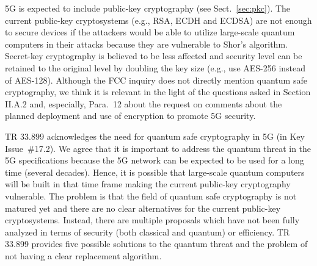 \documentclass[12pt]{llncs}
\begin{document}
5G is expected to include public-key cryptography (see Sect.~\ref{sec:pkc}). The current public-key cryptosystems (e.g., RSA, ECDH and ECDSA) are not enough to secure devices if the attackers would be able to utilize large-scale quantum computers in their attacks because they are vulnerable to Shor's algorithm. %
Secret-key cryptography is believed to be less affected and security level can be retained to the original level by doubling the key size (e.g., use AES-256 instead of AES-128). Although the FCC inquiry does not directly mention quantum safe cryptography, we think it is relevant in the light of the questions asked in Section II.A.2 and, especially, Para.~12 about the request on comments about the planned deployment and use of encryption to promote 5G security.

TR 33.899 acknowledges the need for quantum safe cryptography in 5G (in Key Issue~\#17.2). We agree that it is important to address the quantum threat in the 5G specifications because the 5G network can be expected to be used for a long time (several decades). Hence, it is possible that large-scale quantum computers will be built in that time frame making the current public-key cryptography vulnerable. The problem is that the field of quantum safe cryptography is not matured yet and there are no clear alternatives for the current public-key cryptosystems. Instead, there are multiple proposals which have not been fully analyzed in terms of security (both classical and quantum) or efficiency. TR 33.899 provides five possible solutions to the quantum threat and the problem of not having a clear replacement algorithm.
\end{document}
